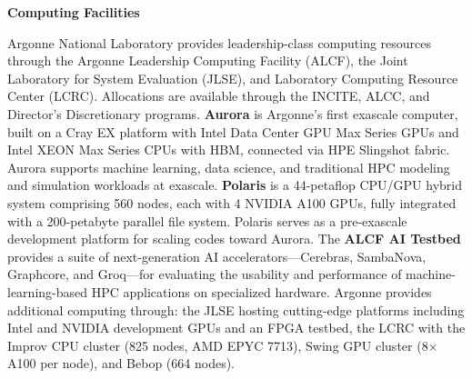 
\medskip
\noindent 
{\bf Computing Facilities}
\medskip

Argonne National Laboratory provides leadership-class computing
resources through the Argonne Leadership Computing Facility (ALCF),
the Joint Laboratory for System Evaluation (JLSE),
and Laboratory Computing Resource Center (LCRC).
Allocations are available through the INCITE, ALCC,
and Director's Discretionary programs.
%
%
\textbf{Aurora} is Argonne's first exascale computer, built on a Cray EX platform with
Intel Data Center GPU Max Series GPUs and Intel XEON Max Series CPUs with HBM, connected
via HPE Slingshot fabric. Aurora supports machine learning, data science, and traditional
HPC modeling and simulation workloads at exascale.
\textbf{Polaris} is a 44-petaflop CPU/GPU hybrid system comprising 560 nodes, each with
4 NVIDIA A100 GPUs, fully integrated with a 200-petabyte parallel file system. Polaris
serves as a pre-exascale development platform for scaling codes toward Aurora.
The \textbf{ALCF AI Testbed} provides a suite of next-generation AI accelerators---Cerebras,
SambaNova, Graphcore, and Groq---for evaluating the usability and performance of
machine-learning-based HPC applications on specialized hardware.
Argonne provides additional computing through: the JLSE hosting cutting-edge platforms 
including Intel and NVIDIA development GPUs and an FPGA testbed, the LCRC with 
the Improv CPU cluster (825 nodes, AMD EPYC 7713), Swing GPU cluster (8$\times$ A100 per node),
and Bebop (664 nodes).

